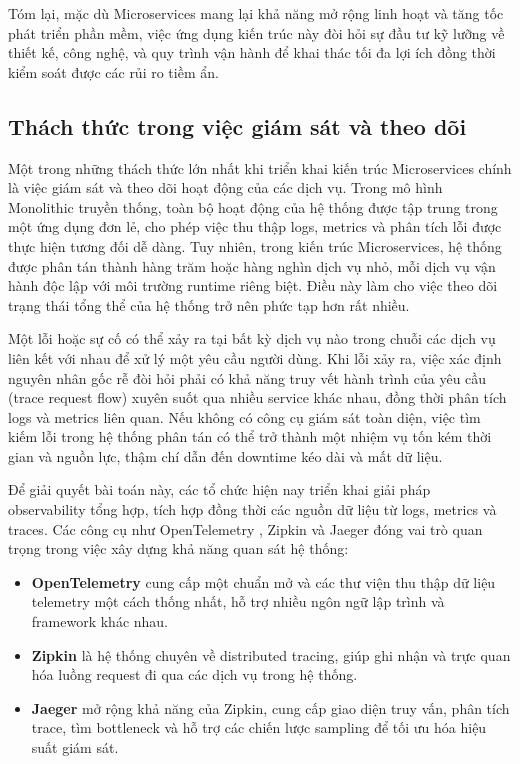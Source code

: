 \documentclass{uetgraduation}
\begin{document}
Tóm lại, mặc dù Microservices mang lại khả năng mở rộng linh hoạt và tăng tốc phát triển phần mềm, việc ứng dụng kiến trúc này đòi hỏi sự đầu tư kỹ lưỡng về thiết kế, công nghệ, và quy trình vận hành để khai thác tối đa lợi ích đồng thời kiểm soát được các rủi ro tiềm ẩn.

\subsection{Thách thức trong việc giám sát và theo dõi}

Một trong những thách thức lớn nhất khi triển khai kiến trúc Microservices chính là việc giám sát và theo dõi hoạt động của các dịch vụ. Trong mô hình Monolithic truyền thống, toàn bộ hoạt động của hệ thống được tập trung trong một ứng dụng đơn lẻ, cho phép việc thu thập logs, metrics và phân tích lỗi được thực hiện tương đối dễ dàng. Tuy nhiên, trong kiến trúc Microservices, hệ thống được phân tán thành hàng trăm hoặc hàng nghìn dịch vụ nhỏ, mỗi dịch vụ vận hành độc lập với môi trường runtime riêng biệt. Điều này làm cho việc theo dõi trạng thái tổng thể của hệ thống trở nên phức tạp hơn rất nhiều.

Một lỗi hoặc sự cố có thể xảy ra tại bất kỳ dịch vụ nào trong chuỗi các dịch vụ liên kết với nhau để xử lý một yêu cầu người dùng. Khi lỗi xảy ra, việc xác định nguyên nhân gốc rễ đòi hỏi phải có khả năng truy vết hành trình của yêu cầu (trace request flow) xuyên suốt qua nhiều service khác nhau, đồng thời phân tích logs và metrics liên quan. Nếu không có công cụ giám sát toàn diện, việc tìm kiếm lỗi trong hệ thống phân tán có thể trở thành một nhiệm vụ tốn kém thời gian và nguồn lực, thậm chí dẫn đến downtime kéo dài và mất dữ liệu.

Để giải quyết bài toán này, các tổ chức hiện nay triển khai giải pháp observability tổng hợp, tích hợp đồng thời các nguồn dữ liệu từ logs, metrics và traces. Các công cụ như OpenTelemetry \cite{otel}, Zipkin \cite{zipkin} và Jaeger \cite{jaeger} đóng vai trò quan trọng trong việc xây dựng khả năng quan sát hệ thống:

\begin{itemize}
    \item \textbf{OpenTelemetry} cung cấp một chuẩn mở và các thư viện thu thập dữ liệu telemetry một cách thống nhất, hỗ trợ nhiều ngôn ngữ lập trình và framework khác nhau.
    \item \textbf{Zipkin} là hệ thống chuyên về distributed tracing, giúp ghi nhận và trực quan hóa luồng request đi qua các dịch vụ trong hệ thống.
    \item \textbf{Jaeger} mở rộng khả năng của Zipkin, cung cấp giao diện truy vấn, phân tích trace, tìm bottleneck và hỗ trợ các chiến lược sampling để tối ưu hóa hiệu suất giám sát.
\end{itemize}
\end{document}
